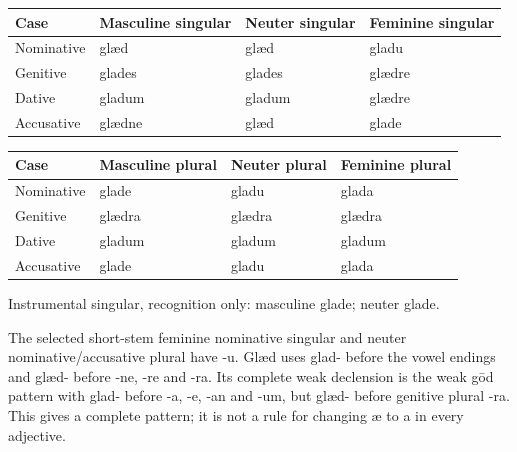 \par\begingroup
\fontsize{10.5}{13.2}\selectfont
\setlength{\LTleft}{0pt}\setlength{\LTright}{\fill}
\noindent
\begin{tabular}{@{}>{\raggedright\arraybackslash}p{22.0mm}>{\raggedright\arraybackslash}p{31.188mm}>{\raggedright\arraybackslash}p{31.188mm}>{\raggedright\arraybackslash}p{31.188mm}@{}}
\toprule
\textbf{Case} & \textbf{Masculine singular} & \textbf{Neuter singular} & \textbf{Feminine singular} \\
\midrule
Nominative & glæd & glæd & gladu \\
Genitive & glades & glades & glædre \\
Dative & gladum & gladum & glædre \\
Accusative & glædne & glæd & glade \\
\bottomrule
\end{tabular}
\par\endgroup
\par\addvspace{5pt}
\par\begingroup
\fontsize{10.5}{13.2}\selectfont
\setlength{\LTleft}{0pt}\setlength{\LTright}{\fill}
\noindent
\begin{tabular}{@{}>{\raggedright\arraybackslash}p{22.0mm}>{\raggedright\arraybackslash}p{31.188mm}>{\raggedright\arraybackslash}p{31.188mm}>{\raggedright\arraybackslash}p{31.188mm}@{}}
\toprule
\textbf{Case} & \textbf{Masculine plural} & \textbf{Neuter plural} & \textbf{Feminine plural} \\
\midrule
Nominative & glade & gladu & glada \\
Genitive & glædra & glædra & glædra \\
Dative & gladum & gladum & gladum \\
Accusative & glade & gladu & glada \\
\bottomrule
\end{tabular}
\par\endgroup
Instrumental singular, recognition only: masculine glade; neuter glade.

The selected short-stem feminine nominative singular and neuter nominative/\allowbreak{}accusative plural have -u. Glæd uses glad- before the vowel endings and glæd- before -ne, -re and -ra. Its complete weak declension is the weak gōd pattern with glad- before -a, -e, -an and -um, but glæd- before genitive plural -ra. This gives a complete pattern; it is not a rule for changing æ to a in every adjective.

